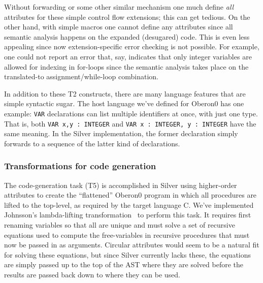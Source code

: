 Without forwarding or some other similar mechanism one much define
\emph{all} attributes for these simple control flow extensions; this
can get tedious.  On the other hand, with
simple macros one cannot define any attributes since all semantic
analysis happens on the expanded (desugared) code.  This is even less
appealing since now extension-specific error checking is not
possible.   For example, one could not report an error that, say, indicates that
only integer variables are allowed for indexing in for-loops
since the semantic analysis takes place on the translated-to
assignment/while-loop combination.




In addition to these T2 constructs, 
there are many language features that are simple syntactic sugar.
%
The host language we've defined for Oberon0 has one
example: \texttt{VAR} declarations can list multiple identifiers at
once, with just one type.
%
That is, both \texttt{VAR x,y : INTEGER} and
\texttt{VAR x : INTEGER, y : INTEGER} have the same meaning.
%
In the Silver implementation, the former declaration simply forwards
to a sequence of the latter kind of declarations.



\subsubsection{Transformations for code generation}


The code-generation task (T5) is accomplished in Silver using
higher-order attributes to create the ``flattened'' Oberon0 program in
which all procedures are lifted to the top-level, as required by the
target language C.  We've implemented Johnsson's lambda-lifting
transformation~\cite{Johnsson85} to perform this task.
It requires first renaming variables so that all are unique and must
solve a set of recursive equations used to compute the
free-variables in recursive procedures that must now be passed in as
arguments.  Circular attributes would seem to be a natural fit for
solving these equations, but since Silver currently lacks these, the
equations are simply passed up to the top of the AST where they are
solved before the results are passed back down to where they can be
used.

